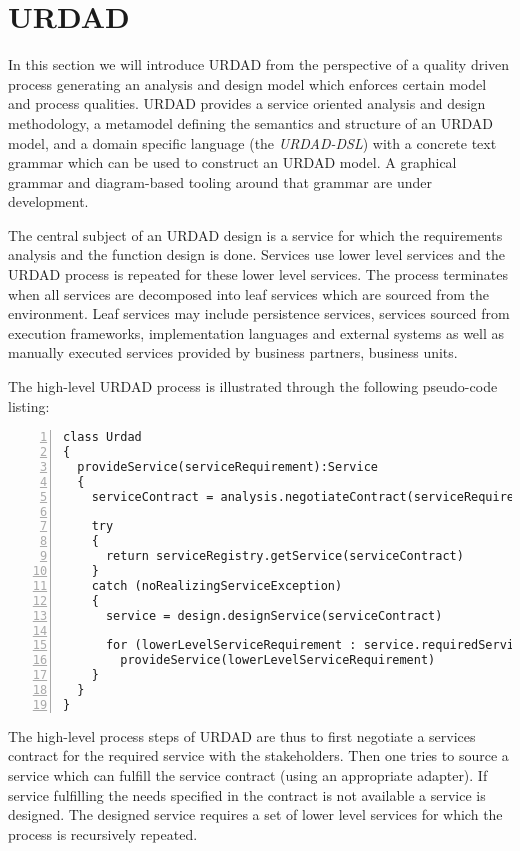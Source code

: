 \section{URDAD}
\label{sec:urdad}

In this section we will introduce URDAD from the perspective of a quality driven process generating an analysis and design model which enforces certain model and process qualities.  URDAD\cite{solms_generating_2009} provides a service oriented analysis and design methodology, a metamodel defining the semantics and structure of an URDAD model, and a domain specific language (the \emph{URDAD-DSL}) with a concrete text grammar which can be used to construct an URDAD model. A graphical grammar and diagram-based tooling around that grammar are under development. 

The central subject of an URDAD design is a service for which the requirements analysis and the function design is done. Services use lower level services and the URDAD process is repeated for these lower level services. The process terminates when all services are decomposed into leaf services which are sourced from the environment. Leaf services may include persistence services, services sourced from execution frameworks, implementation languages and external systems as well as manually executed services provided by business partners, business units.

The high-level URDAD process is illustrated through the following pseudo-code listing:

\lstset{language=pseudoCode,caption=The high-level algorithm of the URDAD process.,label=urdadHighLevel}
\begin{lstlisting}[numbers=left,escapechar=|]
class Urdad
{
  provideService(serviceRequirement):Service
  {
    serviceContract = analysis.negotiateContract(serviceRequirement)
 
    try
    {
      return serviceRegistry.getService(serviceContract)
    }
    catch (noRealizingServiceException)
    {
      service = design.designService(serviceContract)

      for (lowerLevelServiceRequirement : service.requiredServices)
        provideService(lowerLevelServiceRequirement)
    }
  }
}
\end{lstlisting}

The high-level process steps of URDAD are thus to first negotiate a services contract for the required service with the stakeholders. Then one tries to source a service which can fulfill the service contract (using an appropriate adapter). If service fulfilling the needs specified in the contract is not available a service is designed. The designed service requires a set of lower level services for which the process is recursively repeated.

